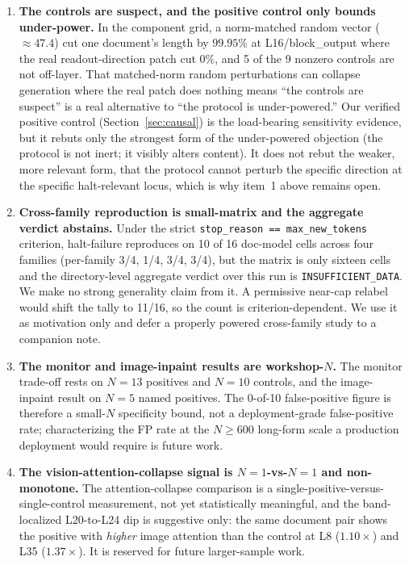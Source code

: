 \documentclass[11pt]{article}
\begin{document}
\begin{enumerate}
  \item \textbf{The controls are suspect, and the positive control only bounds under-power.}
  In the component grid, a norm-matched random vector ($\approx 47.4$) cut one document's
  length by $99.95\%$ at L16/block\_output where the real readout-direction patch cut $0\%$,
  and 5 of the 9 nonzero controls are not off-layer. That matched-norm random perturbations
  can collapse generation where the real patch does nothing means ``the controls are
  suspect'' is a real alternative to ``the protocol is under-powered.'' Our verified positive
  control (Section~\ref{sec:causal}) is the load-bearing sensitivity evidence, but it rebuts
  only the strongest form of the under-powered objection (the protocol is not inert; it
  visibly alters content). It does not rebut the weaker, more relevant form, that the
  protocol cannot perturb the specific direction at the specific halt-relevant locus, which
  is why item~1 above remains open.

  \item \textbf{Cross-family reproduction is small-matrix and the aggregate verdict abstains.}
  Under the strict \texttt{stop\_reason == max\_new\_tokens} criterion, halt-failure reproduces
  on 10 of 16 doc-model cells across four families (per-family 3/4, 1/4, 3/4, 3/4), but the
  matrix is only sixteen cells and the directory-level aggregate verdict over this run is
  \texttt{INSUFFICIENT\_DATA}. We make no strong generality claim from it. A permissive near-cap
  relabel would shift the tally to 11/16, so the count is criterion-dependent. We use it as
  motivation only and defer a properly powered cross-family study to a companion note.

  \item \textbf{The monitor and image-inpaint results are workshop-$N$.} The monitor
  trade-off rests on $N=13$ positives and $N=10$ controls, and the image-inpaint result on
  $N=5$ named positives. The 0-of-10 false-positive figure is therefore a small-$N$
  specificity bound, not a deployment-grade false-positive rate; characterizing the FP rate
  at the $N \geq 600$ long-form scale a production deployment would require is future work.

  \item \textbf{The vision-attention-collapse signal is $N=1$-vs-$N=1$ and non-monotone.} The
  attention-collapse comparison is a single-positive-versus-single-control measurement,
  not yet statistically meaningful, and the band-localized L20-to-L24 dip is suggestive
  only: the same document pair shows the positive with \emph{higher} image attention than
  the control at L8 ($1.10\times$) and L35 ($1.37\times$). It is reserved for future
  larger-sample work.


\end{enumerate}
\end{document}
